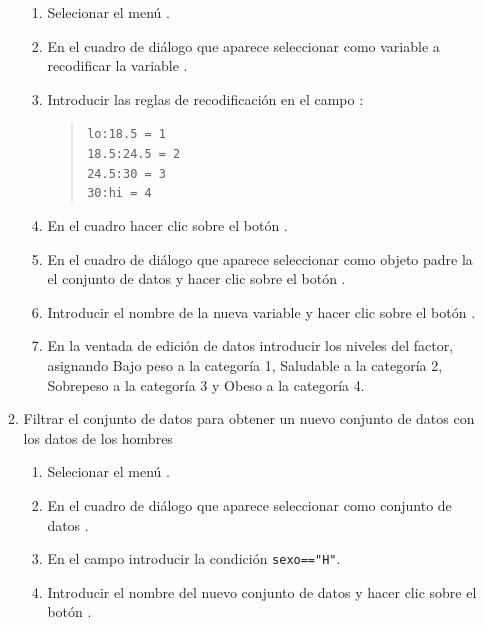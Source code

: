 \begin{enumerate}[leftmargin=*]
\begin{enumerate}
\begin{indicacion}{
\begin{enumerate}
\item Selecionar el menú .
\item En el cuadro de diálogo que aparece seleccionar como variable a recodificar la variable .
\item Introducir las reglas de recodificación en el campo :
\begin{quote}
\lstinline{lo:18.5 = 1}\\
\lstinline{18.5:24.5 = 2}\\
\lstinline{24.5:30 = 3}\\
\lstinline{30:hi = 4}
\end{quote}
\item En el cuadro  hacer clic sobre el botón .
\item En el cuadro de diálogo que aparece seleccionar como objeto padre la el conjunto de datos  y hacer clic sobre el botón .
\item Introducir el nombre de la nueva variable  y hacer clic sobre el botón .
\item En la ventada de edición de datos introducir los niveles del factor, asignando Bajo peso a la categoría 1,
Saludable a la categoría 2, Sobrepeso a la categoría 3 y Obeso a la categoría 4. 
\end{enumerate}
}
\end{indicacion}


\item Filtrar el conjunto de datos para obtener un nuevo conjunto de datos con los datos de los hombres
\begin{indicacion}{
\begin{enumerate}
\item Selecionar el menú .
\item En el cuadro de diálogo que aparece seleccionar como conjunto de datos .
\item En el campo  introducir la condición \lstinline{sexo=="H"}. 
\item Introducir el nombre del  nuevo conjunto de datos  y hacer clic sobre el botón .
\end{enumerate}
}
\end{indicacion}


\end{enumerate}
\end{enumerate}

